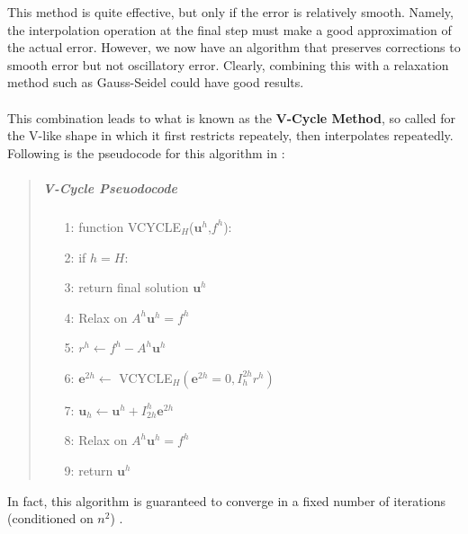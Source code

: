 This method is quite effective, but only if the error is relatively smooth. Namely, the interpolation operation at the final step must make a good approximation of the actual error. However, we now have an algorithm that preserves corrections to smooth error but not oscillatory error. Clearly, combining this with a relaxation method such as Gauss-Seidel could have good results.
\\\\
This combination leads to what is known as the \textbf{V-Cycle Method}, so called for the V-like shape in which it first restricts repeately, then interpolates repeatedly. Following is the pseudocode for this algorithm in \cite{lee14}:
\vspace{-.2in}
\begin{quote}
\item
\subparagraph{V-Cycle Pseuodocode}
\begin{enumerate}
\item[1:] function VCYCLE$_H$($\textbf{u}^h$,$f^h$):
\item[2:] \hspace{.2in} if $h=H$:
\item[3:] \hspace{.4in} return final solution $\textbf{u}^h$
\item[4:] \hspace{.2in} Relax on $A^h\textbf{u}^h=f^h$
\item[5:] \hspace{.2in} $r^{h}\leftarrow f^h-
						A^h\textbf{u}^h$
\item[6:] \hspace{.2in} $\textbf{e}^{2h}\leftarrow$
						VCYCLE$_H(\textbf{e}^{2h}=0,
						I_h^{2h}r^h)$
\item[7:] \hspace{.2in} $\textbf{u}_h\leftarrow
						\textbf{u}^h+I_{2h}^h
						\textbf{e}^{2h}$
\item[8:] \hspace{.2in} Relax on $A^h\textbf{u}^h=f^h$
\item[9:] \hspace{.2in} return $\textbf{u}^h$
\end{enumerate}
\end{quote}
In fact, this algorithm is guaranteed to converge in a fixed number of iterations (conditioned on $n^2$) \cite{gopal08}.